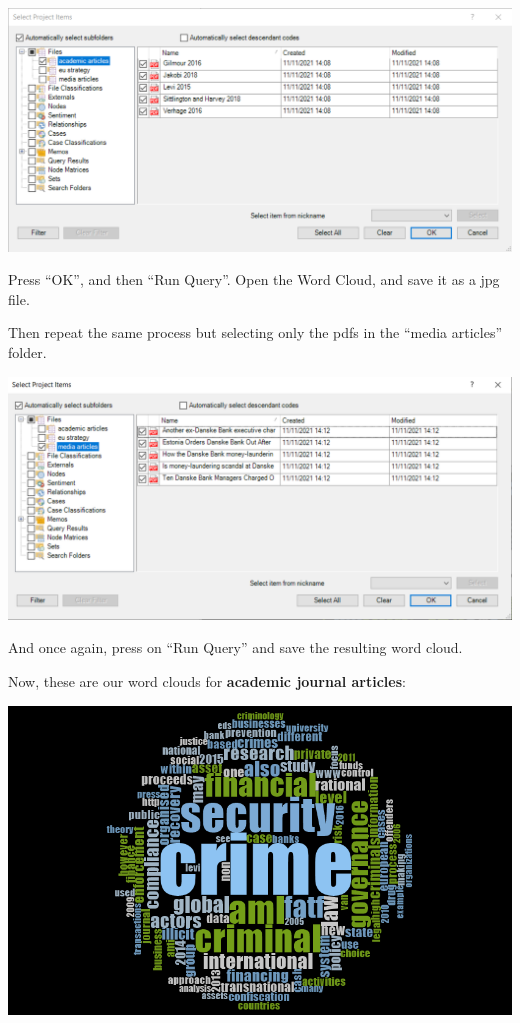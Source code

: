 \documentclass[
]{book}
\begin{document}
\includegraphics{imgs/select_academic.png}

Press ``OK'', and then ``Run Query''. Open the Word Cloud, and save it as a jpg file.

Then repeat the same process but selecting only the pdfs in the ``media articles'' folder.

\includegraphics{imgs/select_media.png}

And once again, press on ``Run Query'' and save the resulting word cloud.

Now, these are our word clouds for \textbf{academic journal articles}:

\includegraphics{imgs/cloud_academic.png}
\end{document}
